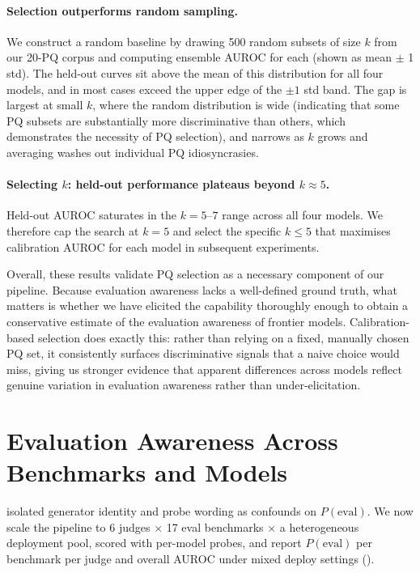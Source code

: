 \documentclass{article}
\begin{document}
\paragraph{Selection outperforms random sampling.}
We construct a random baseline by drawing 500 random subsets of size
$k$ from our 20-PQ corpus and computing ensemble AUROC for each (shown
as mean $\pm$ 1 std). The held-out curves sit above the mean of this
distribution for all four models, and in most cases exceed the upper
edge of the $\pm 1$ std band. The gap is largest at small $k$, where
the random distribution is wide (indicating that some PQ subsets are
substantially more discriminative than others, which demonstrates the
necessity of PQ selection), and narrows as $k$ grows and averaging
washes out individual PQ idiosyncrasies.

\paragraph{Selecting $k$: held-out performance plateaus beyond $k
\approx 5$.}
Held-out AUROC saturates in the $k = 5$--$7$ range across all four
models. We therefore cap the search at $k = 5$ and select the specific
$k \leq 5$ that maximises calibration AUROC for each model in
subsequent experiments.

Overall, these results validate PQ selection as a necessary component
of our pipeline. Because evaluation awareness lacks a well-defined
ground truth, what matters is whether we have elicited the capability
thoroughly enough to obtain a conservative estimate of the evaluation
awareness of frontier models. Calibration-based selection does exactly
this: rather than relying on a fixed, manually chosen PQ set, it
consistently surfaces discriminative signals that a naive choice would
miss, giving us stronger evidence that apparent differences across
models reflect genuine variation in evaluation awareness rather than
under-elicitation.

\section{Evaluation Awareness Across Benchmarks and Models}
\label{sec:results}

 isolated generator identity and probe wording as
confounds on $P(\text{eval})$. We now scale the pipeline to 6 judges
$\times$ 17 eval benchmarks $\times$ a heterogeneous deployment pool,
scored with per-model probes, and report $P(\text{eval})$ per
benchmark per judge and overall AUROC under mixed deploy settings
().
\end{document}
